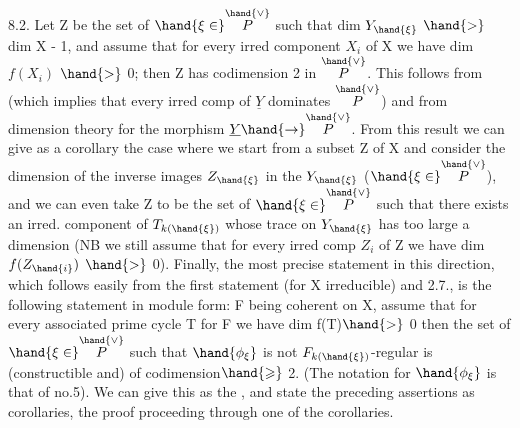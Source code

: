 
8.2. Let Z be the set of $\hand{\xi\in}\overset{\hand{\vee}}{P}$ such that dim $Y_{\hand{\xi}}$ $\hand{>}$ dim X - 1,\hand{\unsure{\xi}}
and assume that for every irred component $X_i$ of X we have dim $f(X_i)$ $\hand{>}$ 0;
then Z has codimension 2 in $\overset{\hand{\vee}}{P}$.  This
follows from 
 (which implies that every irred comp of $\underline{Y}$ dominates $\overset{\hand{\vee}}{P}$) and from
dimension theory for the morphism $\underline{Y} \hand{\to} \overset{\hand{\vee}}{P}$. From this
result  we can give as a corollary the case where
we start from a   subset Z of X and consider the dimension of the
inverse images $Z_{\hand{\xi}}$ in the $Y_{\hand{\xi}}$ ($\hand{\xi\in}\overset{\hand{\vee}}{P}$), and we can even take
Z to be the set of $\hand{\xi\in}\overset{\hand{\vee}}{P}$ such that there exists an irred. component of $T_{k(\hand{\xi})}$
whose trace on $Y_{\hand{\xi}}$ has too large a dimension (NB we still assume
that for every irred comp $Z_i$ of Z we have dim $f(Z_{\hand{i}})$ $\hand{>}$ 0). Finally, the
most precise statement in this direction, which follows easily from the first
statement (for X irreducible) and 2.7., is the following statement in module form:
F being coherent on X,  assume that for every associated prime cycle
T for F we have dim f(T)$\hand{>}$ 0\unsure{;|,} then the set of $\hand{\xi\in}\overset{\hand{\vee}}{P}$ such that
$\hand{\phi_\xi}$ is not $F_{k(\hand{\xi})}$-regular is (constructible and) of codimension$\hand{\geqslant}$ 2.
 (The notation for $\hand{\phi_\xi}$ is that of no.5). We can give this as the
 , and state the  preceding assertions
 as corollaries, the proof proceeding through one of the corollaries.

